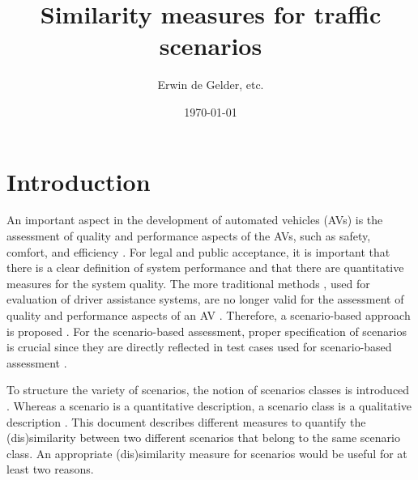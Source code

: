 \documentclass[10pt,final,a4paper,oneside,onecolumn]{article}
\def\reptitle{Similarity measures for traffic scenarios}
\def\repauthor{Erwin de Gelder, etc.}
\theoremstyle{plain}\newtheorem{definition}{Definition}[section]    %
\theoremstyle{definition}\newtheorem{example}{Example}[section]     %
\theoremstyle{remark}\newtheorem{remarkenv}{Remark}[section]        %
\begin{document}

\title{\textbf{\reptitle}}
\author{\repauthor}
\date{\today}
\maketitle

\tableofcontents

\newpage

\section{Introduction}
\label{sec:introduction}
An important aspect in the development of automated vehicles (AVs) is the assessment of quality and performance aspects of the AVs, such as safety, comfort, and efficiency \cite{bengler2014threedecades, stellet2015taxonomy, putz2017pegasus, roesener2016scenariobased, wachenfeld2016release, kompass2015sicherheitsveranderung}. 
For legal and public acceptance, it is important that there is a clear definition of system performance and that there are quantitative measures for the system quality. 
The more traditional methods \cite{response2006code, ISO26262}, used for evaluation of driver assistance systems, are no longer valid for the assessment of quality and performance aspects of an AV \cite{wachenfeld2016release}. 
Therefore, a scenario-based approach is proposed \cite{roesener2016scenariobased, putz2017pegasus, kompass2015sicherheitsveranderung}. 
For the scenario-based assessment, proper specification of scenarios is crucial since they are directly reflected in test cases used for scenario-based assessment \cite{stellet2015taxonomy}.

To structure the variety of scenarios, the notion of scenarios classes is introduced \cite{degelder2018ontology}. Whereas a scenario is a quantitative description, a scenario class is a qualitative description \cite{degelder2018ontology}. This document describes different measures to quantify the (dis)similarity between two different scenarios that belong to the same scenario class. An appropriate (dis)similarity measure for scenarios would be useful for at least two reasons.
\end{document}
